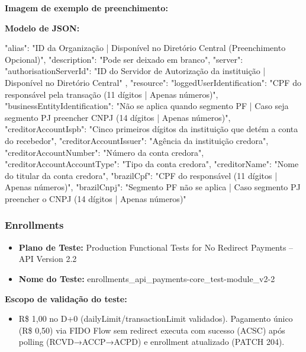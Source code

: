 \textbf{Imagem de exemplo de preenchimento:}

\begin{figure}[H]
    \centering
    \label{fig:pagamentossweeping}
\end{figure}

\textbf{Modelo de JSON:}

\begin{codeblock}
{
    "alias": "ID da Organização | Disponível no Diretório Central (Preenchimento Opcional)",
    "description": "Pode ser deixado em branco",
    "server": {
        "authorisationServerId": "ID do Servidor de Autorização da instituição | Disponível no Diretório Central"
    },
    "resource": {
        "loggedUserIdentification": "CPF do responsável pela transação (11 dígitos | Apenas números)",
        "businessEntityIdentification": "Não se aplica quando segmento PF | Caso seja segmento PJ preencher CNPJ (14 dígitos | Apenas números)",
        "creditorAccountIspb": "Cinco primeiros dígitos da instituição que detém a conta do recebedor",
        "creditorAccountIssuer": "Agência da instituição credora",
        "creditorAccountNumber": "Número da conta credora",
        "creditorAccountAccountType": "Tipo da conta credora",
        "creditorName": "Nome do titular da conta credora",
        "brazilCpf": "CPF do responsável (11 dígitos | Apenas números)",
        "brazilCnpj": "Segmento PF não se aplica | Caso segmento PJ preencher o CNPJ (14 dígitos | Apenas números)"
    }
}
\end{codeblock}

\subsubsection{Enrollments}

\begin{itemize}
    \item \textbf{Plano de Teste:} Production Functional Tests for No Redirect Payments – API Version 2.2
    \item \textbf{Nome do Teste:} enrollments\_api\_payments-core\_test-module\_v2-2
\end{itemize}

\textbf{Escopo de validação do teste:}

\begin{itemize}
    \item R\$ 1,00 no D+0 (dailyLimit/transactionLimit validados). Pagamento único (R\$ 0,50) via FIDO Flow sem redirect executa com sucesso (ACSC) após polling (RCVD→ACCP→ACPD) e enrollment atualizado (PATCH 204).
\end{itemize}

